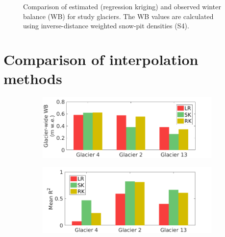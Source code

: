 \documentclass{sfuthesis}
\begin{document}
{\begin{figure}[H]
	\caption[Comparison of estimated (regression kriging) and observed winter balance (WB) for study glaciers]{Comparison of estimated (regression kriging) and observed winter balance (WB) for study glaciers. The WB values are calculated using inverse-distance weighted snow-pit densities (S4).}
	\label{fig:R2regressionkrig}
\end{figure}


\section{Comparison of interpolation methods}
\label{sec:compareInterpMethods}


\begin{figure}
    \centering
    \begin{subfigure}[b]{0.7\textwidth}
      \includegraphics[width=\textwidth]{InterpMethod_mean.png}
        \caption[]{}
    \end{subfigure}
    
    \begin{subfigure}[b]{0.7\textwidth}
       \includegraphics[width=\textwidth]{InterpMethod_meanR2.png}
        \caption[]{}
    \end{subfigure}


\end{figure}}
\end{document}
